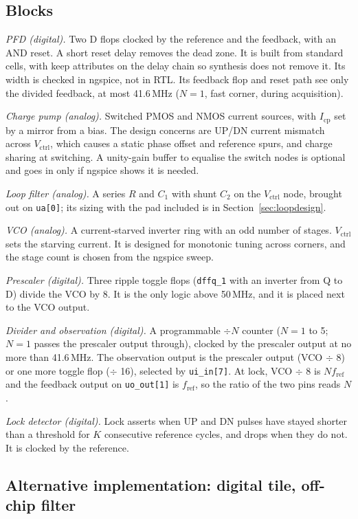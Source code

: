 \documentclass[11pt]{article}
\newcommand{\pin}[1]{\texttt{#1}}              %
\newcommand{\MHz}{\,MHz}
\newcommand{\icp}{I_\mathrm{cp}}
\newcommand{\fref}{f_\mathrm{ref}}
\newcommand{\vctrl}{V_\mathrm{ctrl}}
\begin{document}
\subsection{Blocks}

\emph{PFD (digital).} Two D flops clocked by the reference and the feedback, with an AND reset. A short reset delay removes the dead zone. It is built from standard cells, with keep attributes on the delay chain so synthesis does not remove it. Its width is checked in ngspice, not in RTL. Its feedback flop and reset path see only the divided feedback, at most 41.6\MHz{} ($N = 1$, fast corner, during acquisition).

\emph{Charge pump (analog).} Switched PMOS and NMOS current sources, with $\icp$ set by a mirror from a bias. The design concerns are UP/DN current mismatch across $\vctrl$, which causes a static phase offset and reference spurs, and charge sharing at switching. A unity-gain buffer to equalise the switch nodes is optional and goes in only if ngspice shows it is needed.

\emph{Loop filter (analog).} A series $R$ and $C_1$ with shunt $C_2$ on the $\vctrl$ node, brought out on \pin{ua[0]}; its sizing with the pad included is in Section~\ref{sec:loopdesign}.

\emph{VCO (analog).} A current-starved inverter ring with an odd number of stages. $\vctrl$ sets the starving current. It is designed for monotonic tuning across corners, and the stage count is chosen from the ngspice sweep.

\emph{Prescaler (digital).} Three ripple toggle flops (\pin{dffq\_1} with an inverter from Q to D) divide the VCO by 8. It is the only logic above 50\MHz, and it is placed next to the VCO output.

\emph{Divider and observation (digital).} A programmable $\div N$ counter ($N = 1$ to 5; $N = 1$ passes the prescaler output through), clocked by the prescaler output at no more than 41.6\MHz. The observation output is the prescaler output (VCO $\div$ 8) or one more toggle flop ($\div$ 16), selected by \pin{ui\_in[7]}. At lock, VCO $\div$ 8 is $N\fref$ and the feedback output on \pin{uo\_out[1]} is $\fref$, so the ratio of the two pins reads $N$.

\emph{Lock detector (digital).} Lock asserts when UP and DN pulses have stayed shorter than a threshold for $K$ consecutive reference cycles, and drops when they do not. It is clocked by the reference.

\subsection{Alternative implementation: digital tile, off-chip filter}\label{sec:alt}
\end{document}
